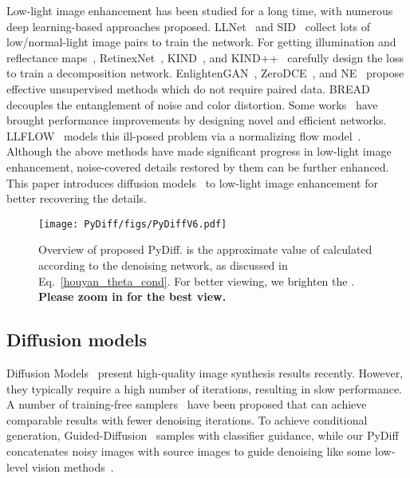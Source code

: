 \documentclass{article}
\begin{document}
Low-light image enhancement has been studied for a long time, with numerous deep learning-based approaches proposed. LLNet~\cite{lore2017llnet} and SID~\cite{chen2018learning} collect lots of low/normal-light image pairs to train the network. For getting illumination and reflectance maps~\cite{land1977retinex}, RetinexNet~\cite{wei2018deep}, KIND~\cite{zhang2019kindling}, and KIND++~\cite{zhang2021beyond} carefully design the loss to train a decomposition network. EnlightenGAN~\cite{jiang2021enlightengan}, ZeroDCE~\cite{guo2020zero}, and NE~\cite{jin2022unsupervised} propose effective unsupervised methods which do not require paired data. BREAD~\cite{guo2022low} decouples the entanglement of noise and color distortion. Some works~\cite{fan2022half,cui2022illumination,kim2021representative} have brought performance improvements by designing novel and efficient networks. LLFLOW~\cite{wang2022low} models this ill-posed problem via a normalizing flow model~\cite{dinh2016density,kingma2018glow}. Although the above methods have made significant progress in low-light image enhancement, noise-covered details restored by them can be further enhanced. This paper introduces diffusion models~\cite{he2020conditional} to low-light image enhancement for better recovering the details.

\begin{figure}[tb]
\begin{center}
        \texttt{[image: PyDiff/figs/PyDiffV6.pdf]}
\end{center}
    
   \caption{Overview of proposed PyDiff.  is the approximate value of  calculated according to the denoising network, as discussed in Eq.~\eqref{houyan_theta_cond}. For better viewing, we brighten the . \textbf{Please zoom in for the best view.}} 
\label{fig:overview}
  \end{figure}

\subsection{Diffusion models}
Diffusion Models~\cite{ho2020denoising,song2020score} present high-quality image synthesis results recently. 
However, they typically require a high number of iterations, resulting in slow performance. A number of training-free samplers~\cite{song2020denoising,nichol2021improved,bao2022analytic,lu2022dpm} have been proposed that can achieve comparable results with fewer denoising iterations. 
To achieve conditional generation, Guided-Diffusion~\cite{dhariwal2021diffusion} samples with classifier guidance, while our PyDiff concatenates noisy images with source images to guide denoising like some low-level vision methods~\cite{saharia2022image,saharia2022palette,whang2022deblurring}. 
\end{document}
